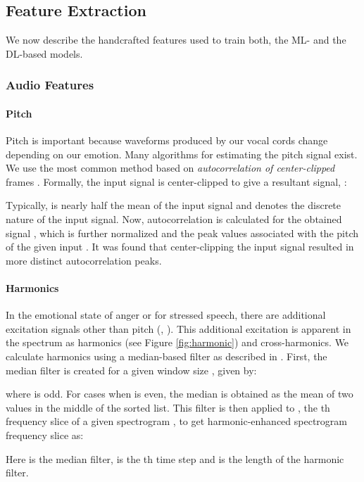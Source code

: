 \documentclass[conference]{IEEEtran}
\begin{document}
\subsection{Feature Extraction} We now describe the handcrafted features used to train both, the ML- and the DL-based models.
\subsubsection{Audio Features}
\paragraph{Pitch} Pitch is important because waveforms produced by our vocal cords change depending on our emotion. Many algorithms for estimating the pitch signal exist. We use the most common method based on \textit{autocorrelation of center-clipped} frames \cite{sondhi1968new}. Formally, the input signal  is center-clipped to give a resultant signal, :



Typically,  is nearly half the mean of the input signal and  denotes the discrete nature of the input signal. Now, autocorrelation is calculated for the obtained signal , which is further normalized and the peak values associated with the pitch of the given input . It was found that center-clipping the input signal resulted in more distinct autocorrelation peaks.

\paragraph{Harmonics} In the emotional state of anger or for stressed speech, there are additional excitation signals other than pitch (\cite{teager1990evidence}, \cite{zhou2001nonlinear}). This additional excitation is apparent in the spectrum as harmonics (see Figure \ref{fig:harmonic}) and cross-harmonics. We calculate harmonics using a median-based filter as described in \cite{fitzgerald2010harmonic}. First, the median filter is created for a given window size , given by:



where  is odd. For cases when  is even, the median is obtained as the mean of two values in the middle of the sorted list. This filter is then applied to , the th frequency slice of a given spectrogram , to get harmonic-enhanced spectrogram frequency slice  as:



Here  is the median filter,  is the th time step and  is the length of the harmonic filter.
\end{document}
